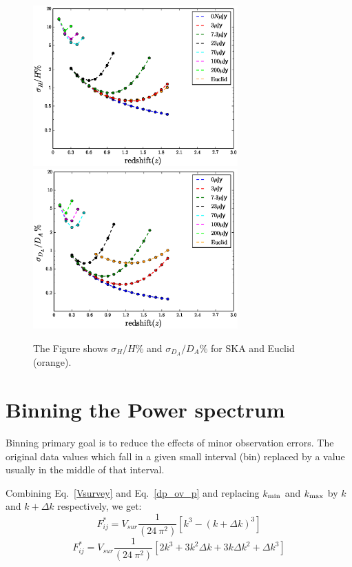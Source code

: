 \documentclass[10pt,a4paper]{article}
\begin{document}
\begin{figure}
\includegraphics[width=0.7\textwidth]{output_lnH_mario_bias.eps}
\includegraphics[width=0.7\textwidth]{output_lnda_mario_bias.eps}
\caption{The Figure shows $\sigma_H/H \%$ and $\sigma_{D_A}/D_A \%$  for SKA and  Euclid (orange).}
\label{fig:lnda_lnH}
\end{figure}


\section{Binning the Power spectrum}

Binning primary goal is to reduce the effects of minor observation errors. The original data values which fall in a given small interval (bin) replaced by a value usually in the middle of that interval. 

Combining Eq.~\ref{Vsurvey} and Eq.~\ref{dp_ov_p}  and replacing $k_{\rm min}$ and $k_{\rm max}$ by $k$ and $k+ \Delta k$ respectively, we get:
\begin{equation}\label{dp_ov_p}
F_{ij}^*= V_{sur} \frac{1}{ (24 \ \pi^2 )} \left[ k^3 -(k+ \Delta k) ^3 \right]
\end{equation}
\begin{equation}\label{dp_ov_p_deltak}
F_{ij}^*= V_{sur} \frac{1}{ (24 \ \pi^2 )} \left[ 2 k^3 + 3k^2  \Delta k  + 3 k \Delta k^2 + \Delta k^3 \right]
\end{equation}
\end{document}
